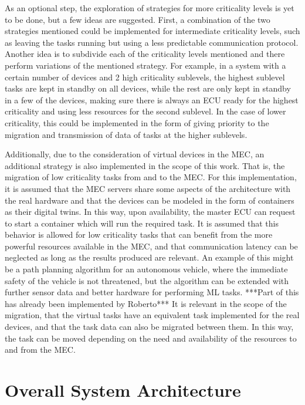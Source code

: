 As an optional step, the exploration of strategies for more criticality levels is yet to be done, but a few ideas are suggested. First, a combination of the two strategies mentioned could be implemented for intermediate criticality levels, such as leaving the tasks running but using a less predictable communication protocol. Another idea is to subdivide each of the criticality levels mentioned and there perform variations of the mentioned strategy. For example, in a system with a certain number of devices and 2 high criticality sublevels, the highest sublevel tasks are kept in standby on all devices, while the rest are only kept in standby in a few of the devices, making sure there is always an ECU ready for the highest criticality and using less resources for the second sublevel. In the case of lower criticality, this could be implemented in the form of giving priority to the migration and transmission of data of tasks at the higher sublevels.

Additionally, due to the consideration of virtual devices in the MEC, an additional strategy is also implemented in the scope of this work. That is, the migration of low criticality tasks from and to the MEC. For this implementation, it is assumed that the MEC servers share some aspects of the architecture with the real hardware and that the devices can be modeled in the form of containers as their digital twins. In this way, upon availability, the master ECU can request to start a container which will run the required task. It is assumed that this behavior is allowed for low criticality tasks that can benefit from the more powerful resources available in the MEC, and that communication latency can be neglected as long as the results produced are relevant. An example of this might be a path planning algorithm for an autonomous vehicle, where the immediate safety of the vehicle is not threatened, but the algorithm can be extended with further sensor data and better hardware for performing ML tasks. ***Part of this has already been implemented by Roberto*** It is relevant in the scope of the migration, that the virtual tasks have an equivalent task implemented for the real devices, and that the task data can also be migrated between them. In this way, the task can be moved depending on the need and availability of the resources to and from the MEC.


\section{Overall System Architecture}

